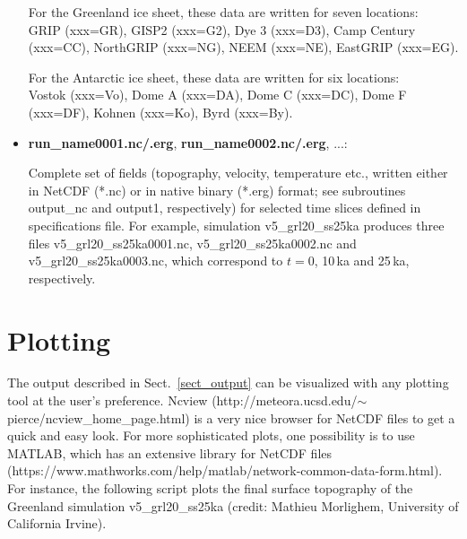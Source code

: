 \documentclass[12pt,a4paper]{article}
\begin{document}
\begin{itemize}
For the Greenland ice sheet, these data are written for seven locations:
\\
GRIP (xxx=GR), GISP2 (xxx=G2), Dye 3 (xxx=D3), Camp Century (xxx=CC), NorthGRIP (xxx=NG), NEEM (xxx=NE), EastGRIP (xxx=EG).

For the Antarctic ice sheet, these data are written for six locations:
\\
Vostok (xxx=Vo), Dome A (xxx=DA), Dome C (xxx=DC), Dome F (xxx=DF), Kohnen (xxx=Ko), Byrd (xxx=By).

\item \textbf{run\_name0001.nc/.erg}, \textbf{run\_name0002.nc/.erg}, ...:

Complete set of fields (topography, velocity, temperature etc., written either in NetCDF (*.nc) or in native binary (*.erg) format; see subroutines output\_nc and output1, respectively) for selected time slices defined in specifications file.
\linebreak
For example, simulation v5\_grl20\_ss25ka produces three files
\linebreak
v5\_grl20\_ss25ka0001.nc, v5\_grl20\_ss25ka0002.nc and v5\_grl20\_ss25ka0003.nc, which correspond to $t=0$, 10\,ka and 25\,ka, respectively.

\end{itemize}

\clearpage


\section{Plotting}
\label{sect_plotting}

The output described in Sect.~\ref{sect_output} can be visualized with any plotting tool at the user's preference. Ncview (http://meteora.ucsd.edu/$\sim${}pierce/ncview\_home\_page.html) is a very nice browser for NetCDF files to get a quick and easy look. For more sophisticated plots, one possibility is to use MATLAB, which has an extensive library for NetCDF files (https://www.mathworks.com/help/matlab/network-common-data-form.html). For instance, the following script plots the final surface topography of the Greenland simulation v5\_grl20\_ss25ka (credit: Mathieu Morlighem, University of California Irvine).

\vspace*{2ex}
\end{document}
